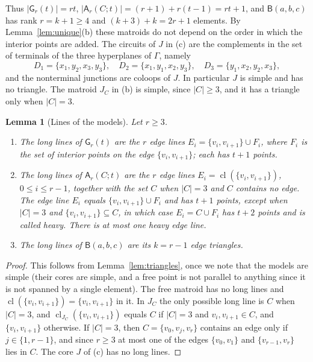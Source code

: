 \documentclass[11pt]{amsart}
\newtheorem{lemma}[theorem]{Lemma}
\theoremstyle{definition}
\theoremstyle{remark}
\numberwithin{equation}{section}
\newcommand{\cl}{\operatorname{cl}}
\newcommand{\GW}{\mathsf{G}}
\newcommand{\FA}{\mathsf{A}}
\newcommand{\FB}{\mathsf{B}}
\begin{document}
Thus $|\GW_r(t)|=rt$, $|\FA_r(C;t)|=(r+1)+r(t-1)=rt+1$, and $\FB(a,b,c)$ has rank $r=k+1\ge4$ and $(k+3)+k=2r+1$ elements. By Lemma~\ref{lem:unique}(b) these matroids do not depend on the order in which the interior points are added. The circuits of $J$ in (c) are the complements in the set of terminals of the three hyperplanes of $\Gamma$, namely
\begin{equation}\label{eq:Bcircuits}
D_1=\{x_1,y_2,x_3,y_3\},\quad D_2=\{x_1,y_1,x_2,y_3\},\quad D_3=\{y_1,x_2,y_2,x_3\},
\end{equation}
and the nonterminal junctions are coloops of $J$. In particular $J$ is simple and has no triangle. The matroid $J_C$ in (b) is simple, since $|C|\ge3$, and it has a triangle only when $|C|=3$.

\begin{lemma}[Lines of the models]\label{lem:modellines}
Let $r\ge3$.
\begin{enumerate}[label=\textup{(\alph*)}]
\item The long lines of $\GW_r(t)$ are the $r$ \emph{edge lines} $E_i=\{v_i,v_{i+1}\}\cup F_i$, where $F_i$ is the set of interior points on the edge $\{v_i,v_{i+1}\}$; each has $t+1$ points.
\item The long lines of $\FA_r(C;t)$ are the $r$ edge lines $E_i=\cl(\{v_i,v_{i+1}\})$, $0\le i\le r-1$, together with the set $C$ when $|C|=3$ and $C$ contains no edge. The edge line $E_i$ equals $\{v_i,v_{i+1}\}\cup F_i$ and has $t+1$ points, except when $|C|=3$ and $\{v_i,v_{i+1}\}\subseteq C$, in which case $E_i=C\cup F_i$ has $t+2$ points and is called \emph{heavy}. There is at most one heavy edge line.
\item The long lines of $\FB(a,b,c)$ are its $k=r-1$ edge triangles.
\end{enumerate}
\end{lemma}

\begin{proof}
This follows from Lemma~\ref{lem:triangles}, once we note that the models are simple (their cores are simple, and a free point is not parallel to anything since it is not spanned by a single element). The free matroid has no long lines and $\cl(\{v_i,v_{i+1}\})=\{v_i,v_{i+1}\}$ in it. In $J_C$ the only possible long line is $C$ when $|C|=3$, and $\cl_{J_C}(\{v_i,v_{i+1}\})$ equals $C$ if $|C|=3$ and $v_i,v_{i+1}\in C$, and $\{v_i,v_{i+1}\}$ otherwise. If $|C|=3$, then $C=\{v_0,v_j,v_r\}$ contains an edge only if $j\in\{1,r-1\}$, and since $r\ge3$ at most one of the edges $\{v_0,v_1\}$ and $\{v_{r-1},v_r\}$ lies in $C$. The core $J$ of (c) has no long lines.
\end{proof}
\end{document}
